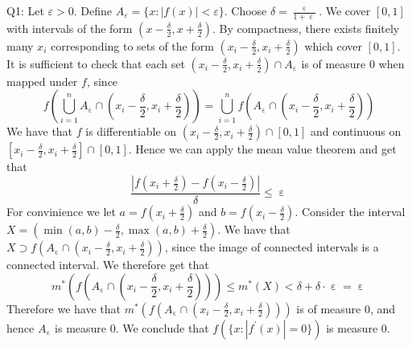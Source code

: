 \documentclass[letterpaper]{article}
\DeclareMathOperator{\ep}{\varepsilon}
\begin{document}
\noindent
Q1: Let $\varepsilon>0$. Define $A_\varepsilon = \{x: |f(x)|<\varepsilon\}$. Choose $\delta = \frac{\ep}{1+ \ep}$. We cover $[0,1]$ with intervals of the form $(x - \frac{\delta}{2} , x + \frac{\delta}{2})$. By compactness, there exists finitely many $x_i$ corresponding to sets of the form $(x_i-\frac{\delta}{2}, x_i + \frac{\delta}{2})$ which cover $[0,1]$. 
It is sufficient to check that each set $(x_i - \frac{\delta}{2}, x_i + \frac{\delta}{2})\cap A_{\ep}$ is of measure 0 when mapped under $f$, since $$f(\bigcup_{i=1}^n A_{\ep} \cap (x_i - \frac{\delta}{2} , x_i + \frac{\delta}{2})) = \bigcup_{i=1}^n f(A_{\ep} \cap (x_i - \frac{\delta}{2} , x_i + \frac{\delta}{2}))$$
We have that $f$ is differentiable on $(x_i - \frac{\delta}{2} , x_i + \frac{\delta}{2}) \cap [0,1]$ and continuous on $[x_i - \frac{\delta}{2} , x_i + \frac{\delta}{2}] \cap [0,1]$. 
Hence we can apply the mean value theorem and get that $$\frac{|f(x_i + \frac{\delta}{2}) - f(x_i - \frac{\delta}{2}) |}{\delta} \leq \ep  $$
For convinience we let $a=f(x_i + \frac{\delta}{2})$ and $b = f(x_i - \frac{\delta}{2})$. Consider the interval $X = (\min(a,b) - \frac{\delta}{2}, \max(a,b) + \frac{\delta}{2})$. We have that $X \supset f(A_{\ep} \cap (x_i - \frac{\delta}{2}, x_i + \frac{\delta}{2}))$, since the image of connected intervals is a connected interval. We therefore get that $$m^\ast (f(A_{\ep} \cap (x_i - \frac{\delta}{2}, x_i + \frac{\delta}{2}))) \leq m^\ast(X) < \delta + \delta \cdot \ep = \ep$$
Therefore we have that $m^\ast(f(A_{\ep} \cap (x_i - \frac{\delta}{2}, x_i + \frac{\delta}{2})))$ is of measure 0, and hence $A_{\ep}$ is measure 0. We conclude that $f(\{x: |f^\prime(x)|=0 \})$ is measure 0. 
\end{document}
